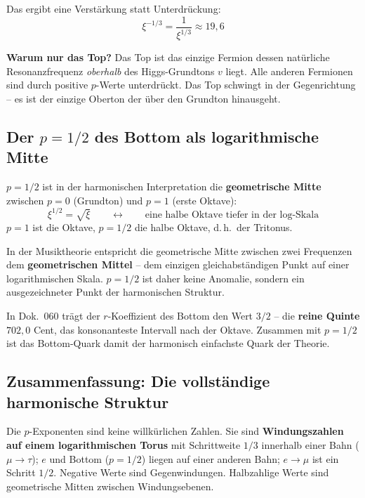 Das ergibt eine Verstärkung statt Unterdrückung:
\begin{equation}
    \xi^{-1/3} = \frac{1}{\xi^{1/3}} \approx 19{,}6
\end{equation}

\textbf{Warum nur das Top?} Das Top ist das einzige Fermion dessen
natürliche Resonanzfrequenz \emph{oberhalb} des Higgs-Grundtons $v$
liegt. Alle anderen Fermionen sind durch positive $p$-Werte unterdrückt.
Das Top schwingt in der Gegenrichtung -- es ist der einzige Oberton
der über den Grundton hinausgeht.

\subsection{Der $p = 1/2$ des Bottom als logarithmische Mitte}

$p = 1/2$ ist in der harmonischen Interpretation die
\textbf{geometrische Mitte} zwischen $p = 0$ (Grundton) und $p = 1$
(erste Oktave):
\begin{equation}
    \xi^{1/2} = \sqrt{\xi} \qquad \longleftrightarrow \qquad
    \text{eine halbe Oktave tiefer in der log-Skala}
\end{equation}
$p = 1$ ist die Oktave, $p = 1/2$ die halbe Oktave, d.\,h.\ der Tritonus.

In der Musiktheorie entspricht die geometrische Mitte zwischen zwei
Frequenzen dem \textbf{geometrischen Mittel} -- dem einzigen
gleichabständigen Punkt auf einer logarithmischen Skala. $p = 1/2$
ist daher keine Anomalie, sondern ein ausgezeichneter Punkt der
harmonischen Struktur.

In Dok.~060 trägt der $r$-Koeffizient des Bottom den Wert $3/2$ --
die \textbf{reine Quinte} $702{,}0$ Cent, das konsonanteste
Intervall nach der Oktave. Zusammen mit $p = 1/2$ ist das Bottom-Quark
damit der harmonisch einfachste Quark der Theorie.

\subsection{Zusammenfassung: Die vollständige harmonische Struktur}

Die $p$-Exponenten sind keine willkürlichen Zahlen. Sie sind
\textbf{Windungszahlen auf einem logarithmischen Torus} mit
Schrittweite $1/3$ innerhalb einer Bahn ($\mu\to\tau$); $e$ und Bottom ($p = 1/2$)
liegen auf einer anderen Bahn; $e\to\mu$ ist ein Schritt $1/2$. Negative Werte sind Gegenwindungen.
Halbzahlige Werte sind geometrische Mitten zwischen Windungsebenen.

